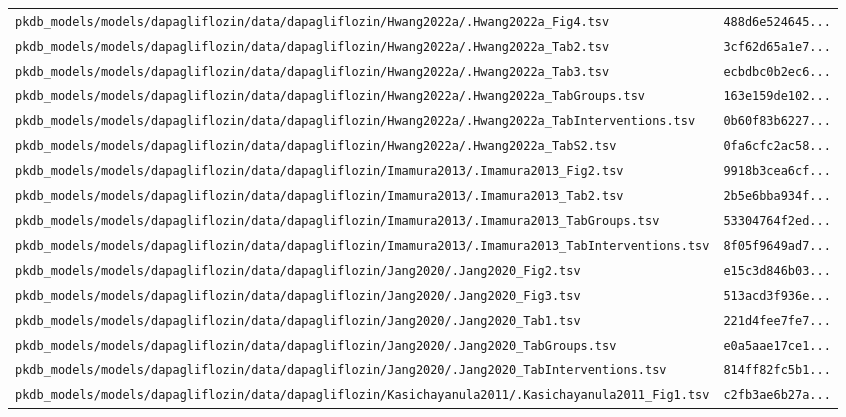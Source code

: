\documentclass{article}
\begin{document}
\begin{longtable}{ll}
\texttt{pkdb\_models/models/dapagliflozin/data/dapagliflozin/Hwang2022a/.Hwang2022a\_Fig4.tsv} & \texttt{488d6e524645...} \\
\texttt{pkdb\_models/models/dapagliflozin/data/dapagliflozin/Hwang2022a/.Hwang2022a\_Tab2.tsv} & \texttt{3cf62d65a1e7...} \\
\texttt{pkdb\_models/models/dapagliflozin/data/dapagliflozin/Hwang2022a/.Hwang2022a\_Tab3.tsv} & \texttt{ecbdbc0b2ec6...} \\
\texttt{pkdb\_models/models/dapagliflozin/data/dapagliflozin/Hwang2022a/.Hwang2022a\_TabGroups.tsv} & \texttt{163e159de102...} \\
\texttt{pkdb\_models/models/dapagliflozin/data/dapagliflozin/Hwang2022a/.Hwang2022a\_TabInterventions.tsv} & \texttt{0b60f83b6227...} \\
\texttt{pkdb\_models/models/dapagliflozin/data/dapagliflozin/Hwang2022a/.Hwang2022a\_TabS2.tsv} & \texttt{0fa6cfc2ac58...} \\
\texttt{pkdb\_models/models/dapagliflozin/data/dapagliflozin/Imamura2013/.Imamura2013\_Fig2.tsv} & \texttt{9918b3cea6cf...} \\
\texttt{pkdb\_models/models/dapagliflozin/data/dapagliflozin/Imamura2013/.Imamura2013\_Tab2.tsv} & \texttt{2b5e6bba934f...} \\
\texttt{pkdb\_models/models/dapagliflozin/data/dapagliflozin/Imamura2013/.Imamura2013\_TabGroups.tsv} & \texttt{53304764f2ed...} \\
\texttt{pkdb\_models/models/dapagliflozin/data/dapagliflozin/Imamura2013/.Imamura2013\_TabInterventions.tsv} & \texttt{8f05f9649ad7...} \\
\texttt{pkdb\_models/models/dapagliflozin/data/dapagliflozin/Jang2020/.Jang2020\_Fig2.tsv} & \texttt{e15c3d846b03...} \\
\texttt{pkdb\_models/models/dapagliflozin/data/dapagliflozin/Jang2020/.Jang2020\_Fig3.tsv} & \texttt{513acd3f936e...} \\
\texttt{pkdb\_models/models/dapagliflozin/data/dapagliflozin/Jang2020/.Jang2020\_Tab1.tsv} & \texttt{221d4fee7fe7...} \\
\texttt{pkdb\_models/models/dapagliflozin/data/dapagliflozin/Jang2020/.Jang2020\_TabGroups.tsv} & \texttt{e0a5aae17ce1...} \\
\texttt{pkdb\_models/models/dapagliflozin/data/dapagliflozin/Jang2020/.Jang2020\_TabInterventions.tsv} & \texttt{814ff82fc5b1...} \\
\texttt{pkdb\_models/models/dapagliflozin/data/dapagliflozin/Kasichayanula2011/.Kasichayanula2011\_Fig1.tsv} & \texttt{c2fb3ae6b27a...} \\

\end{longtable}
\end{document}
